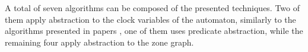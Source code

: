 \begin{runningExample}
A total of seven algorithms can be composed of the presented techniques. Two of them apply abstraction to the clock variables of the automaton, similarly to the algorithms presented in papers \cite{dierks2007automatic, he2010compositional,okano2011clock}, one of them uses predicate abstraction, while the remaining four apply abstraction to the zone graph. 



%
















\end{runningExample}
